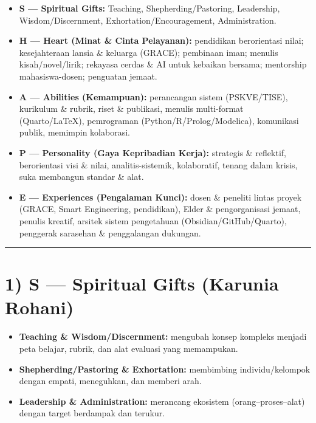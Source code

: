 \documentclass[
  letterpaper,
  DIV=11,
  numbers=noendperiod]{scrreprt}
\providecommand{\tightlist}{%
  \setlength{\itemsep}{0pt}\setlength{\parskip}{0pt}}\usepackage{longtable,booktabs,array}
\begin{document}
\begin{itemize}
\tightlist
\item
  \textbf{S --- Spiritual Gifts:} Teaching, Shepherding/Pastoring,
  Leadership, Wisdom/Discernment, Exhortation/Encouragement,
  Administration.
\item
  \textbf{H --- Heart (Minat \& Cinta Pelayanan):} pendidikan
  berorientasi nilai; kesejahteraan lansia \& keluarga (GRACE);
  pembinaan iman; menulis kisah/novel/lirik; rekayasa cerdas \& AI untuk
  kebaikan bersama; mentorship mahasiswa-dosen; penguatan jemaat.
\item
  \textbf{A --- Abilities (Kemampuan):} perancangan sistem (PSKVE/TISE),
  kurikulum \& rubrik, riset \& publikasi, menulis multi-format
  (Quarto/LaTeX), pemrograman (Python/R/Prolog/Modelica), komunikasi
  publik, memimpin kolaborasi.
\item
  \textbf{P --- Personality (Gaya Kepribadian Kerja):} strategis \&
  reflektif, berorientasi visi \& nilai, analitis-sistemik, kolaboratif,
  tenang dalam krisis, suka membangun standar \& alat.
\item
  \textbf{E --- Experiences (Pengalaman Kunci):} dosen \& peneliti
  lintas proyek (GRACE, Smart Engineering, pendidikan), Elder \&
  pengorganisasi jemaat, penulis kreatif, arsitek sistem pengetahuan
  (Obsidian/GitHub/Quarto), penggerak sarasehan \& penggalangan
  dukungan.
\end{itemize}

\begin{center}\rule{0.5\linewidth}{0.5pt}\end{center}

\section{1) S --- Spiritual Gifts (Karunia
Rohani)}\label{s-spiritual-gifts-karunia-rohani}

\begin{itemize}
\tightlist
\item
  \textbf{Teaching \& Wisdom/Discernment:} mengubah konsep kompleks
  menjadi peta belajar, rubrik, dan alat evaluasi yang memampukan.
\item
  \textbf{Shepherding/Pastoring \& Exhortation:} membimbing
  individu/kelompok dengan empati, meneguhkan, dan memberi arah.
\item
  \textbf{Leadership \& Administration:} merancang ekosistem
  (orang--proses--alat) dengan target berdampak dan terukur.
\end{itemize}
\end{document}
